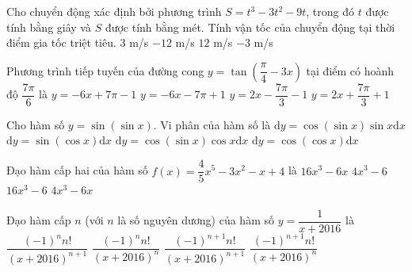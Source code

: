 \begin{ex}%
	Cho chuyển động xác định bởi phương trình $S=t^3-3t^2-9t$, trong đó $t$ được tính bằng giây và $S$ được tính bằng mét. Tính vận tốc của chuyển động tại thời điểm gia tốc triệt tiêu.
	\choice
	{$3$ m/s}
	{\True $-12$ m/s}
	{$12$ m/s}
	{$-3$ m/s}
\end{ex}

\begin{ex}%
	Phương trình tiếp tuyến của đường cong $y=\tan \left(\dfrac{\pi}{4}-3x\right)$ tại điểm có hoành độ $\dfrac{7\pi}{6}$ là
	\choice
	{\True $y=-6x+7\pi-1$}
	{$y=-6x-7\pi+1$}
	{$y=2x-\dfrac{7\pi}{3}-1$}
	{$y=2x+\dfrac{7\pi}{3}+1$}
\end{ex}

\begin{ex}%
	Cho hàm số $y=\sin (\sin x)$. Vi phân của hàm số là
	\choice
	{$\mathrm{d}y=\cos (\sin x)\sin x \mathrm{d}x$}
	{$\mathrm{d}y=\sin(\cos x)\mathrm{d}x$}
	{\True $\mathrm{d}y=\cos (\sin x)\cos x\mathrm{d}x$}
	{$\mathrm{d}y=\cos(\cos x)\mathrm{d}x$}
\end{ex}

\begin{ex}%
	Đạo hàm cấp hai của hàm số $f(x)=\dfrac{4}{5}x^5-3x^2-x+4$ là
	\choice
	{$16x^3-6x$}
	{$4x^3-6$}
	{\True $16x^3-6$}
	{$4x^3-6x$}
\end{ex}

\begin{ex}%
	Đạo hàm cấp $n$ (với $n$ là số nguyên dương) của hàm số $y=\dfrac{1}{x+2016}$ là
	\choice
	{\True $\dfrac{(-1)^nn!}{(x+2016)^{n+1}}$}
	{$\dfrac{(-1)^nn!}{(x+2016)^{n}}$}
	{$\dfrac{(-1)^{n+1}n!}{(x+2016)^{n+1}}$}
	{$\dfrac{(-1)^{n+1}n!}{(x+2016)^{n}}$}
\end{ex}

